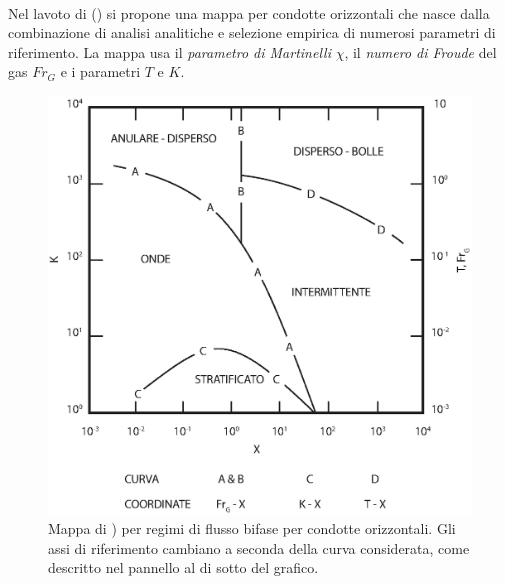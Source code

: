 \paragraph{\textcite{taitel1976model}}
Nel lavoto di \textcite{taitel1976model} () si propone una mappa per condotte orizzontali che nasce dalla combinazione di analisi analitiche e selezione empirica di numerosi parametri di riferimento. La mappa usa il \textit{parametro di Martinelli} \(\chi\), il \textit{numero di Froude} del gas \(Fr_G\) e i parametri \(T\) e \(K\).

\begin{figure}[htbp]
    \centering
    \includegraphics[width=.6\textwidth]{fig/fluidodinamica/taitel.eps}
    \caption{Mappa di \textcite{taitel1976model}) per regimi di flusso bifase per condotte orizzontali. Gli assi di riferimento cambiano a seconda della curva considerata, come descritto nel pannello al di sotto del grafico.}
    \label{fig:taitel}
\end{figure}

